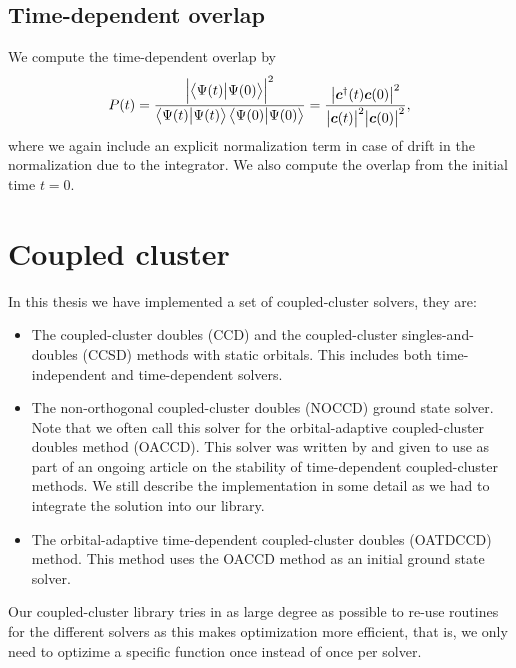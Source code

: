         \subsection{Time-dependent overlap}
            We compute the time-dependent overlap by
            \begin{align}
                P(t)
                =
                \frac{
                    \abs{\braket{\Psi(t)}{\Psi(0)}}^2
                }{
                    \braket{\Psi(t)}\braket{\Psi(0)}
                }
                = \frac{
                    \abs{\boldsymbol{c}^{\dagger}(t)\boldsymbol{c}(0)}^2
                }{
                    \abs{\boldsymbol{c}(t)}^2
                    \abs{\boldsymbol{c}(0)}^2
                },
            \end{align}
            where we again include an explicit normalization term in case of
            drift in the normalization due to the integrator.
            We also compute the overlap from the initial time $t = 0$.

    \section{Coupled cluster}
        In this thesis we have implemented a set of coupled-cluster solvers,
        they are:
        \begin{itemize}
            \item The coupled-cluster doubles (CCD) and the coupled-cluster
                singles-and-doubles (CCSD) methods with static orbitals.
                This includes both time-independent and time-dependent solvers.
            \item The non-orthogonal coupled-cluster doubles (NOCCD) ground
                state solver.
                Note that we often call this solver for the orbital-adaptive
                coupled-cluster doubles method (OACCD).
                This solver was written by \citeauthor{rolf-nocc}
                \cite{rolf-nocc} and given to use as part of an ongoing article
                on the stability of time-dependent coupled-cluster methods.
                We still describe the implementation in some detail as we had to
                integrate the solution into our library.
            \item The orbital-adaptive time-dependent coupled-cluster doubles
                (OATDCCD) method.
                This method uses the OACCD method as an initial ground state
                solver.
        \end{itemize}
        Our coupled-cluster library tries in as large degree as possible to
        re-use routines for the different solvers as this makes optimization
        more efficient, that is, we only need to optizime a specific function
        once instead of once per solver.

